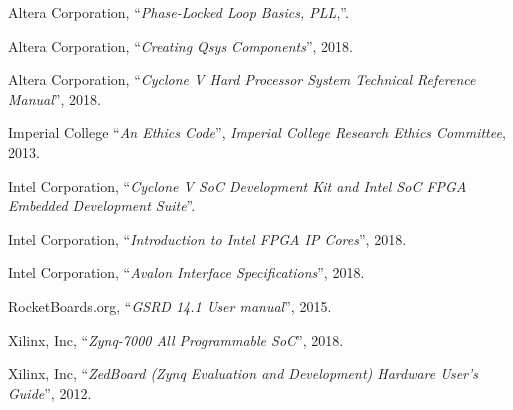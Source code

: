 \begin{thebibliography}{1}
  Altera Corporation,
  ``\textit{Phase-Locked Loop Basics, PLL},''.

  Altera Corporation,
  ``\textit{Creating Qsys Components}'',
  2018.

  Altera Corporation,
  ``\textit{Cyclone V Hard Processor System Technical Reference Manual}'',
  2018.

  Imperial College
  ``\textit{An Ethics Code}'',
  \textit{Imperial College Research Ethics Committee},
  2013.

  Intel Corporation,
  ``\textit{Cyclone V SoC Development Kit and Intel SoC FPGA Embedded
  Development Suite}''.

  Intel Corporation,
  ``\textit{Introduction to Intel FPGA IP Cores}'',
  2018.

  Intel Corporation,
  ``\textit{Avalon Interface Specifications}'',
  2018.

  RocketBoards.org,
  ``\textit{GSRD 14.1 User manual}'',
  2015.

  Xilinx, Inc,
  ``\textit{Zynq-7000 All Programmable SoC}'',
  2018.

  Xilinx, Inc,
  ``\textit{ZedBoard (Zynq Evaluation and Development) Hardware User's Guide}'',
  2012.
\end{thebibliography}